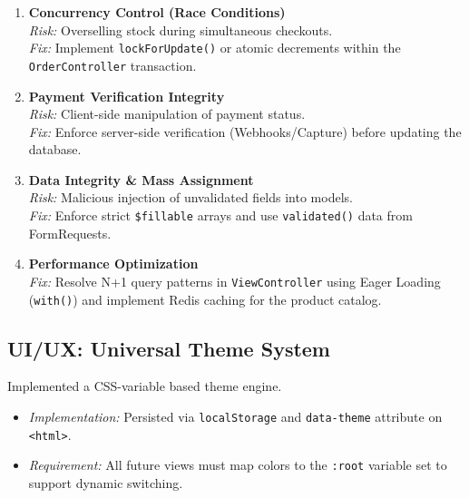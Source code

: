 \begin{enumerate}
    \item \textbf{Concurrency Control (Race Conditions)} \\
    \textit{Risk:} Overselling stock during simultaneous checkouts. \\
    \textit{Fix:} Implement \texttt{lockForUpdate()} or atomic decrements within the \texttt{OrderController} transaction.
    
    \item \textbf{Payment Verification Integrity} \\
    \textit{Risk:} Client-side manipulation of payment status. \\
    \textit{Fix:} Enforce server-side verification (Webhooks/Capture) before updating the database.
    
    \item \textbf{Data Integrity \& Mass Assignment} \\
    \textit{Risk:} Malicious injection of unvalidated fields into models. \\
    \textit{Fix:} Enforce strict \texttt{\$fillable} arrays and use \texttt{validated()} data from FormRequests.
    
    \item \textbf{Performance Optimization} \\
    \textit{Fix:} Resolve N+1 query patterns in \texttt{ViewController} using Eager Loading (\texttt{with()}) and implement Redis caching for the product catalog.
\end{enumerate}

\subsection{UI/UX: Universal Theme System}
Implemented a CSS-variable based theme engine.
\begin{itemize}
    \item \textit{Implementation:} Persisted via \texttt{localStorage} and \texttt{data-theme} attribute on \texttt{<html>}.
    \item \textit{Requirement:} All future views must map colors to the \texttt{:root} variable set to support dynamic switching.
\end{itemize}
